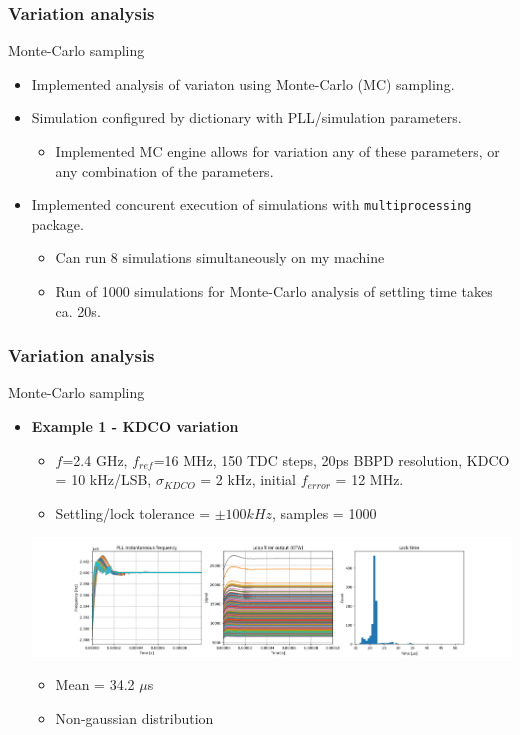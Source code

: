 \documentclass[t, screen, aspectratio=43]{beamer}
\begin{document}
\begin{frame}
	\frametitle{Variation analysis}
	\begin{block}{Monte-Carlo sampling }
		\begin{itemize}
		\scriptsize
		\item Implemented analysis of variaton using Monte-Carlo (MC) sampling.
		\item Simulation configured by dictionary with PLL/simulation parameters. 
		\begin{itemize}
			\scriptsize
			\item Implemented MC engine allows for variation any of these parameters, or any combination of the parameters.
		\end{itemize}
		\item Implemented concurent execution of simulations with \texttt{multiprocessing} package.
		\begin{itemize}
			\scriptsize
			\item Can run 8 simulations simultaneously on my machine
			\item Run of 1000 simulations for Monte-Carlo analysis of settling time takes ca. 20s.
		\end{itemize}
		\end{itemize}    
	\end{block}
\end{frame}

\begin{frame}
	\frametitle{Variation analysis}
	\begin{block}{Monte-Carlo sampling }
		\begin{itemize}
		\scriptsize
		\item \textbf{Example 1 - KDCO variation}
		\begin{itemize}
			\scriptsize
			\item $f$=2.4 GHz, $f_{ref}$=16 MHz, 150 TDC steps, 20ps BBPD resolution, KDCO = 10 kHz/LSB, $\sigma_{KDCO}$ = 2 kHz, initial $f_{error}$ = 12 MHz.
			\item Settling/lock tolerance = $\pm 100 kHz$, samples = 1000
		\end{itemize}
		\center\includegraphics[width=1.0\linewidth]{kdco_mc_hist.png}
		\begin{itemize}
			\scriptsize
			\item Mean = 34.2 $\mu$s
			\item Non-gaussian distribution
		\end{itemize}

		\end{itemize}    
	\end{block}
\end{frame}
\end{document}
